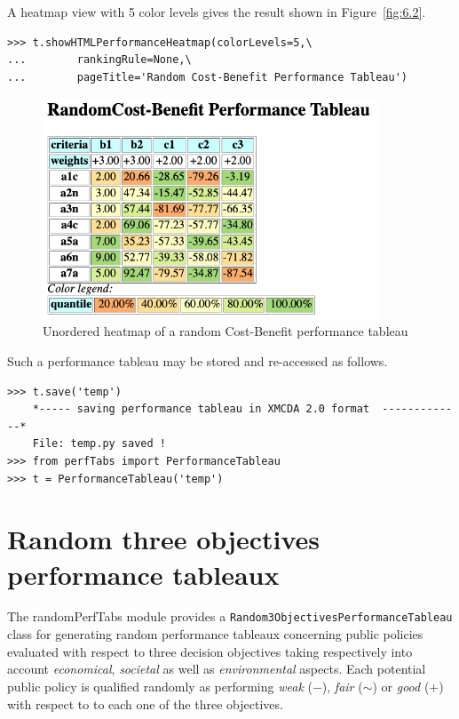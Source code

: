 A heatmap view with 5 color levels gives the result shown in Figure~\vref{fig:6.2}.
\begin{lstlisting}
>>> t.showHTMLPerformanceHeatmap(colorLevels=5,\
...        rankingRule=None,\
...        pageTitle='Random Cost-Benefit Performance Tableau')
 \end{lstlisting}
\begin{figure}[ht]
\includegraphics[width=10cm]{Figures/6-2-randomCBHeatmap.png}
\caption{Unordered heatmap of a random Cost-Benefit performance tableau}
\label{fig:6.2}       %
\end{figure}
 
Such a performance tableau may be stored and re-accessed as follows.
\begin{lstlisting}
>>> t.save('temp')
    *----- saving performance tableau in XMCDA 2.0 format  -------------*
    File: temp.py saved !
>>> from perfTabs import PerformanceTableau
>>> t = PerformanceTableau('temp')
\end{lstlisting}

\section{Random three objectives performance tableaux}
\label{sec:6.4}

The randomPerfTabs module provides a \texttt{Random3ObjectivesPerformance\-Tableau} class for generating random performance tableaux concerning public policies evaluated with respect to three decision objectives taking respectively into account \emph{economical}, \emph{societal} as well as \emph{environmental} aspects. Each potential public policy is qualified randomly as performing \emph{weak} ($-$), \emph{fair} ($\sim$) or \emph{good} ($+$) with respect to to each one of the three objectives. 

